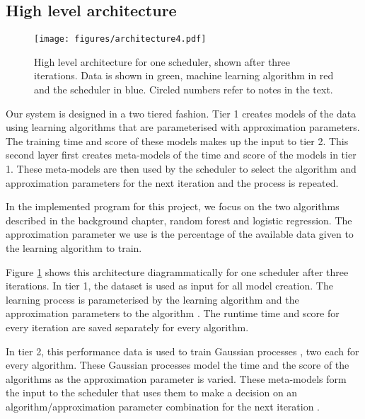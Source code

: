 \documentclass[a4paper,12pt,twoside,openright]{report}
\begin{document}
\subsection{High level architecture}
\begin{figure}[p]
    \centerline{\texttt{[image: figures/architecture4.pdf]}}
  \caption{High level architecture for one scheduler, shown after three iterations. Data is shown in green, machine learning algorithm in red and the scheduler in blue. Circled numbers refer to notes in the text.}
    \label{architecture}
\end{figure}


Our system is designed in a two tiered fashion. Tier 1 creates models of the data using learning algorithms that are parameterised with approximation parameters. The training time and score of these models makes up the input to tier 2. This second layer first creates meta-models of the time and score of the models in tier 1. These meta-models are then used by the scheduler to select the algorithm and approximation parameters for the next iteration and the process is repeated.

In the implemented program for this project, we focus on the two algorithms described in the background chapter, random forest and logistic regression. The approximation parameter we use is the percentage of the available data given to the learning algorithm to train.

Figure \ref{architecture} shows this architecture diagrammatically for one scheduler after three iterations. In tier 1, the dataset \raisebox{.5pt}{\textcircled{\raisebox{-.9pt} {1}}} is used as input for all model creation. The learning process is parameterised by the learning algorithm and the approximation parameters to the algorithm \raisebox{.5pt}{\textcircled{\raisebox{-.9pt} {2}}}. The runtime time and score for every iteration are saved \raisebox{.5pt}{\textcircled{\raisebox{-.9pt} {3}}} separately for every algorithm.

In tier 2, this performance data is used to train Gaussian processes \raisebox{.5pt}{\textcircled{\raisebox{-.9pt} {4}}}, two each for every algorithm. These Gaussian processes model the time and the score of the algorithms as the approximation parameter is varied. These meta-models form the input to the scheduler \raisebox{.5pt}{\textcircled{\raisebox{-.9pt} {5}}} that uses them to make a decision on an algorithm/approximation parameter combination for the next iteration \raisebox{.5pt}{\textcircled{\raisebox{-.9pt} {6}}}.
\end{document}
